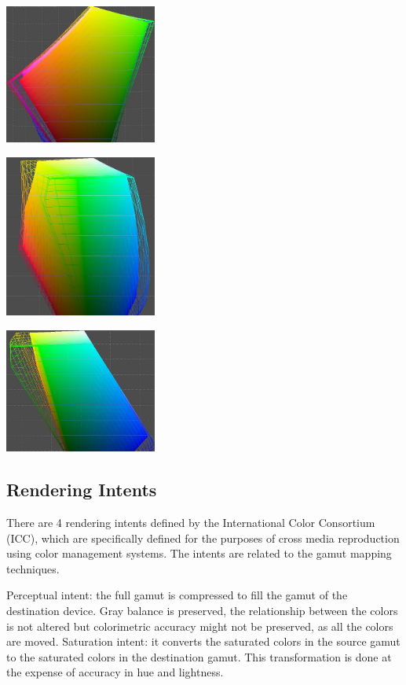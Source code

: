 \includegraphics[width=5.0cm]{ColorPaper/aperio_sRGB_v2.jpg}

\includegraphics[width=5.0cm]{ColorPaper/aperio_sRGB_v3.jpg}

\includegraphics[width=5.0cm]{ColorPaper/aperio_sRGB_v4.jpg}

\subsection{Rendering Intents}
There are 4 rendering intents defined by the International Color Consortium (ICC), which are
specifically defined for the purposes of cross media reproduction using color management
systems. The intents are related to the gamut mapping techniques.

Perceptual intent: the full gamut is compressed to fill the gamut of the destination
device. Gray balance is preserved, the relationship between the colors is not altered
but colorimetric accuracy might not be preserved, as all the colors are moved.
Saturation intent: it converts the saturated colors in the source gamut to the saturated
colors in the destination gamut. This transformation is done at the expense of
accuracy in hue and lightness.

